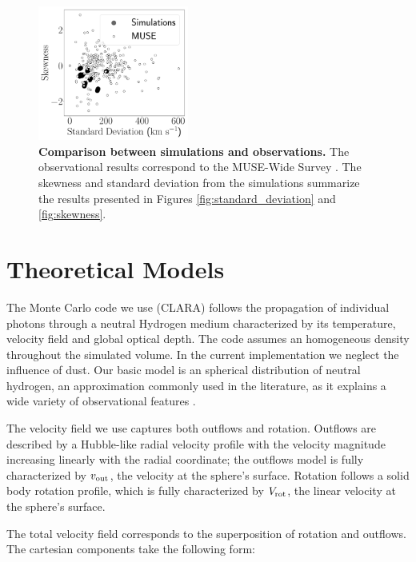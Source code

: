 \documentclass[a4paper,fleqn,usenatbib]{mnras}
\begin{document}
\begin{figure}
\centering
\includegraphics[width=0.44\textwidth]{muse_vs_simulations.pdf}

\caption{\textbf{Comparison between simulations and observations.}  
The observational results correspond to the MUSE-Wide Survey
\citep{2017A&A...606A..12H}. The skewness and standard deviation from
the simulations summarize the results presented in Figures
\ref{fig:standard_deviation} and \ref{fig:skewness}.
  \label{fig:muse}}
\end{figure}


\section{Theoretical Models}
\label{sec:theory}


The Monte Carlo code we use (CLARA) \citep{CLARA} follows the propagation of
individual photons through a neutral Hydrogen medium characterized by
its temperature, velocity field and global optical depth.
The code assumes an homogeneous density throughout the simulated
volume.
In the current implementation we neglect the influence of dust.
Our basic model is an spherical distribution of neutral hydrogen,
an approximation commonly used in the literature, as it explains a
wide variety of observational features
\citep{Ahn03,Verhamme06,Dijkstra06}. 


The velocity field we use captures both outflows and rotation.
Outflows are described by a Hubble-like radial velocity profile with
the velocity magnitude increasing linearly with the radial
coordinate; the outflows model is fully characterized by $v_{\rm out}$, the
velocity at the sphere's surface.
Rotation follows a solid body rotation profile, which is fully
characterized by $V_{\rm rot}$, the linear velocity at the sphere's surface.

The total velocity field corresponds to the superposition of rotation and
outflows.
The cartesian components take the following form:
\end{document}
